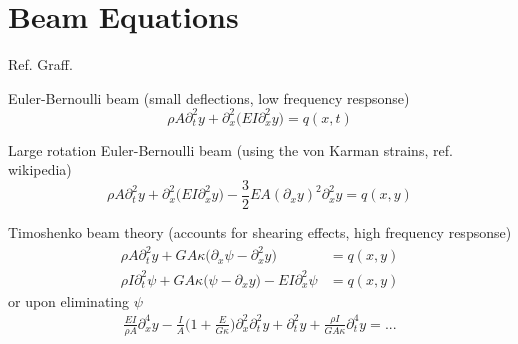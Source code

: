 \section{Beam Equations} \label{sec:beams}


Ref. Graff. 

Euler-Bernoulli beam  (small deflections, low frequency respsonse)
\[
  \rho A \partial_t^2 y + \partial_x^2\big( E I \partial_x^2 y\big) = q(x,t) 
\]


Large rotation Euler-Bernoulli beam (using the von Karman strains, ref. wikipedia)
\[
  \rho A \partial_t^2 y + \partial_x^2\big( E I \partial_x^2 y\big) 
           - \frac{3}{2} E A (\partial_x y)^2  \partial_x^2 y  = q(x,y) 
\]


Timoshenko beam theory (accounts for shearing effects, high frequency respsonse)
\begin{align*}
  \rho A \partial_t^2 y + G A \kappa\Big(  \partial_x \psi - \partial_x^2 y \Big)  &= q(x,y)  \\
  \rho I \partial_t^2 \psi + G A \kappa\Big( \psi - \partial_x y \Big)  - E I \partial_x^2 \psi &= q(x,y) 
\end{align*}
or upon eliminating $\psi$
\begin{align*}
    \frac{EI}{\rho A}\partial_x^4 y - \frac{I}{A}\Big(1 +\frac{E}{G\kappa}\Big)\partial_x^2\partial_t^2 y + \partial_t^2 y 
             + \frac{\rho I}{G A \kappa}\partial_t^4 y = ...
\end{align*}